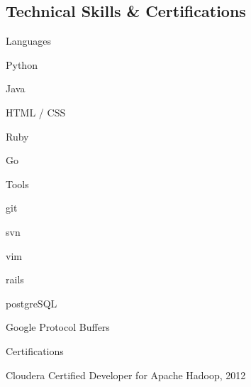 \documentclass[a4paper,margin,line]{resume}
\begin{document}
\begin{resume}
\section{\mysidestyle Technical Skills \& Certifications}
	\begin{compactdesc}
		\item[Languages] \begin{inparaenum} { \small
			\item Python
			\item Java
			\item HTML / CSS
			\item Ruby
			\item Go
		} \end{inparaenum}
		\item[Tools] \begin{inparaenum} { \small
			\item git
            \item svn
            \item vim
            \item rails
            \item postgreSQL
            \item Google Protocol Buffers
		} \end{inparaenum}
        \item[Certifications] \begin{inparaenum} { \small
            \item Cloudera Certified Developer for Apache Hadoop, 2012    
        } \end{inparaenum}
	\end{compactdesc}


\end{resume}
\end{document}
